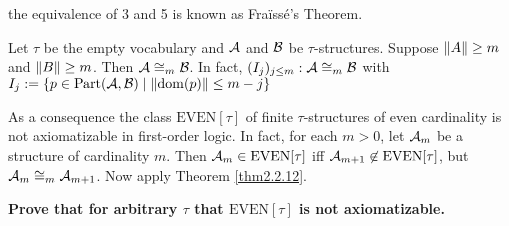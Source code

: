 \documentclass[11pt]{article}
\def \Part {\text{Part}}
\def \EVEN {\text{EVEN}}
\begin{document}
the equivalence of 3 and 5 is known as Fraïssé's Theorem. 

\begin{examplle}[]
Let \(\tau\) be the empty vocabulary and \(\mathcal{A}\) and \(\mathcal{B}\) be \(\tau\)-structures. Suppose
\(\left\lVert A\right\rVert\ge m\) and \(\left\lVert B\right\rVert\ge m\). Then \(\mathcal{A}\cong_m\mathcal{B}\). In fact,
\((I_j)_{j\le m}:\mathcal{A}\cong_m\mathcal{B}\) with
\(I_j:=\{p\in\Part(\cala,\calb)\mid\norm{\dom(p)}\le m-j\}\)

As a consequence the class \(\EVEN[\tau]\) of finite \(\tau\)-structures of even cardinality is not
axiomatizable in first-order logic. In fact, for each \(m>0\), let \(\mathcal{A}_m\) be a structure of
cardinality \(m\). Then \(\cala_m\in\EVEN[\tau]\) iff \(\cala_{m+1}\not\in\EVEN[\tau]\), but
\(\mathcal{A}_m\cong_m\mathcal{A}_{m+1}\). Now apply Theorem \ref{thm2.2.12}.

\textbf{Prove that for arbitrary \(\tau\) that \(\EVEN[\tau]\) is not axiomatizable.} \label{Problem1}
\end{examplle}
\end{document}
